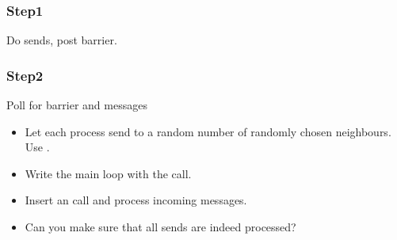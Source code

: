 
\begin{frame}[containsverbatim]\frametitle{Step1}
  Do sends, post barrier.
\end{frame}

\begin{frame}[containsverbatim]\frametitle{Step2}
  Poll for barrier and messages
\end{frame}

\begin{exerciseframe}[ibarrierupdate]
  \begin{itemize}
  \item Let each process send to a random number of randomly chosen
    neighbours. Use .
  \item Write the main loop with the  call.
  \item Insert an  call and process incoming messages.
  \item Can you make sure that all sends are indeed processed?
  \end{itemize}
\end{exerciseframe}

\begin{comment}
  \begin{frame}[containsverbatim]\frametitle{Problem with `progress'}
    \begin{itemize}
    \item Problem: \indexmpishow{MPI_Test} is local
    \item Something needs to force the barrier information to propagate
    \item Solution: force progress with \indexmpishow{MPI_Iprobe}
    \item Frowny face: barrier completion takes much longer than you'd expect.
    \end{itemize}
  \end{frame}
\end{comment}

\endinput

\begin{frame}[containsverbatim]\frametitle{}
\begin{lstlisting}
  
\end{lstlisting}
\end{frame}

